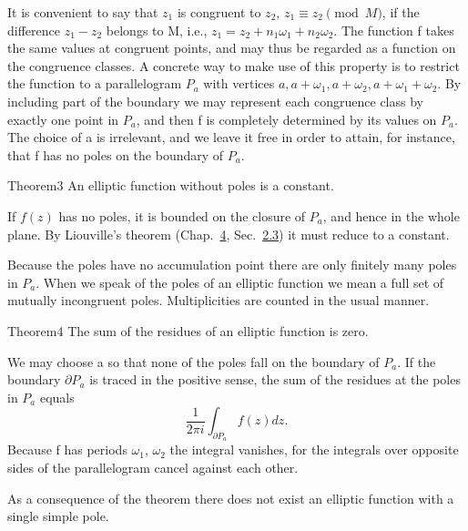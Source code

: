 It is convenient to say that $z_{1}$ is congruent to $z_{2}$, $z_{1} \equiv z_{2} \pmod{M}$, if the difference $z_{1} - z_{2}$ belongs to M, i.e., $z_{1} = z_{2} + n_{1}\omega_{1} + n_{2}\omega_{2}$. The function f takes the same values at congruent points, and may thus be regarded as a function on the congruence classes. A concrete way to make use of this property is to restrict the function to a parallelogram $P_{a}$ with vertices $a, a + \omega_{1}, a + \omega_{2}, a + \omega_{1} + \omega_{2}$. By including part of the boundary we may represent each congruence class by exactly one point in $P_{a}$, and then f is completely determined by its values on $P_{a}$. The choice of a is irrelevant, and we leave it free in order to attain, for instance, that f has no poles on the boundary of $P_{a}$.

\begin{originalstatement}{Theorem}{3}\label{thm:7.3}
An elliptic function without poles is a constant.
\end{originalstatement}
If $f(z)$ has no poles, it is bounded on the closure of $P_{a}$, and hence in the whole plane. By Liouville's theorem (Chap.~\hyperref[chap:4]{4}, Sec.~\hyperref[sec:4.2.3]{2.3}) it must reduce to a constant.

Because the poles have no accumulation point there are only finitely many poles in $P_{a}$. When we speak of the poles of an elliptic function we mean a full set of mutually incongruent poles. Multiplicities are counted in the usual manner.


\begin{originalstatement}{Theorem}{4}\label{thm:7.4}
The sum of the residues of an elliptic function is zero.
\end{originalstatement}
We may choose a so that none of the poles fall on the boundary of $P_{a}$. If the boundary $\partial P_{a}$ is traced in the positive sense, the sum of the residues at the poles in $P_{a}$ equals
\begin{equation*}
\frac {1}{2 \pi i} \int_ {\partial P _ {a}} f (z) d z.
\end{equation*}
Because f has periods $\omega_{1}$, $\omega_{2}$ the integral vanishes, for the integrals over opposite sides of the parallelogram cancel against each other.

As a consequence of the theorem there does not exist an elliptic function with a single simple pole.

